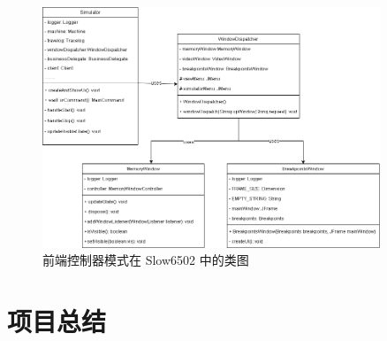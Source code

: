 \documentclass[cn,black,12pt,normal]{elegantnote}
\begin{document}
\begin{figure}[H]
  \centering
  \includegraphics[width=0.9\textwidth]{figures/前端控制器模式.png}
  \caption{前端控制器模式在 Slow6502 中的类图}
\end{figure}

\section{项目总结}






\end{document}

